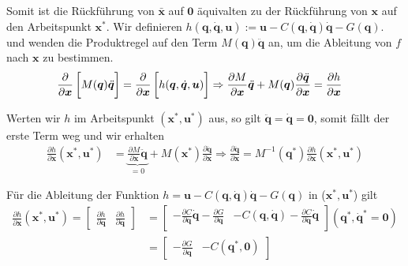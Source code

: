 \documentclass[a4paper, 12pt]{scrartcl}
\begin{document}
Somit ist die Rückführung von $\bar{\bm{x}}$ auf $\bm{0}$ 
äquivalten zu der Rückführung von $\bm{x}$ auf den Arbeitspunkt $\bm{x}^*$.
Wir definieren 
$h(\bm{q} , \dot{\bm{q}}, \bm{u}):= \bm{u} - C(\bm{q},\dot{\bm{q}}) \dot{\bm{q}} - G(\bm{q})$.
und wenden die Produktregel auf den Term $M(\bm{q}) \ddot{\bm{q}}$ an, um die Ableitung von $f$ nach $\bm{x}$ zu bestimmen.
\begin{align*}
    \frac{\partial}{\partial \bm{x}} 
    \left[ 
        \vphantom{\int}
        M(\bm{q}) \ddot{\bm{q}}
    \right] 
    &= 
    \frac{\partial}{\partial \bm{x}} 
    \left[
        \vphantom{\int}
        h(\bm{q}, \dot{\bm{q}}, \bm{u})
    \right]
    \Rightarrow
    \frac{\partial M}{\partial \bm{x}} \ddot{\bm{q}} 
    + M(\bm{q}) \frac{\partial \ddot{\bm{q}}}{\partial \bm{x}} 
    = 
    \frac{\partial h}{\partial \bm{x}}
\end{align*}

Werten wir $h$ im Arbeitspunkt $(\bm{x}^*, \bm{u}^*)$ aus, 
so gilt $\ddot{\bm{q}} = \dot{\bm{q}} = \bm{0}$, 
somit fällt der erste Term weg und wir erhalten
\begin{align*}
    \frac{\partial h}{\partial \bm{x}}(\bm{x}^*, \bm{u}^*)
    &=
    \underbrace{
        \frac{\partial M}{\partial \bm{x}} \ddot{\bm{q}} 
        }_{=0}
    + M(\bm{x}^*) \frac{\partial \ddot{\bm{q}}}{\partial \bm{x}}  
    \Rightarrow
    \frac{\partial \ddot{\bm{q}}}{\partial \bm{x}} 
    = 
    M^{-1}(\bm{q}^*) \frac{\partial h}{\partial \bm{x}}(\bm{x}^*, \bm{u}^*)
\end{align*}

Für die Ableitung der Funktion $h = \bm{u} - C(\bm{q}, \dot{\bm{q}}) \dot{\bm{q}} - G(\bm{q})$ in ($\bm{x}^*, \bm{u}^*$) gilt
\begin{align*}
    \frac{\partial h}{\partial \bm{x}}(\bm{x}^*, \bm{u}^*)
    =
    \begin{bmatrix}
        \frac{\partial h}{\partial \bm{q}} & \frac{\partial h}{\partial \dot{\bm{q}}}
    \end{bmatrix}
    &=
    \begin{bmatrix}
        -\frac{\partial C}{\partial \bm{q}} \dot{\bm{q}} - \frac{\partial G}{\partial \bm{q}} & -C(\bm{q}, \dot{\bm{q}}) - \frac{\partial C}{\partial \dot{\bm{q}}} \dot{\bm{q}} \\
    \end{bmatrix}
    (\bm{q}^*, \dot{\bm{q}}^* = \bm{0}) \\
    &=
    \begin{bmatrix}
        -\frac{\partial G}{\partial \bm{q}} & -C(\bm{q}^*, \bm{0})
    \end{bmatrix}
\end{align*}
\end{document}

